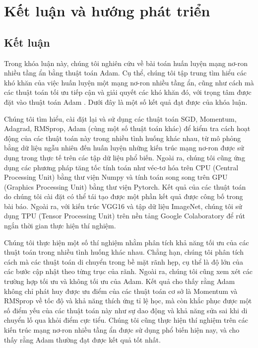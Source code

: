 \chapter{Kết luận và hướng phát triển}
\label{Chapter5}

\section{Kết luận}

Trong khóa luận này, chúng tôi nghiên cứu về bài toán huấn luyện mạng nơ-ron nhiều tầng ẩn bằng thuật toán Adam. Cụ thể, chúng tôi tập trung tìm hiểu các khó khăn của việc huấn luyện một mạng nơ-ron nhiều tầng ẩn, cũng như cách mà các thuật toán tối ưu tiếp cận và giải quyết các khó khăn đó, với trọng tâm được đặt vào thuật toán Adam \cite{kingma2014adam}. Dưới đây là một số kết quả đạt được của khóa luận.

Chúng tôi tìm hiểu, cài đặt lại và sử dụng các thuật toán SGD, Momentum, Adagrad, RMSprop, Adam (cùng một số thuật toán khác) để kiểm tra cách hoạt động của các thuật toán này trong nhiều tình huống khác nhau, từ mô phỏng bằng dữ liệu ngẫu nhiên đến huấn luyện những kiến trúc mạng nơ-ron được sử dụng trong thực tế trên các tập dữ liệu phổ biến. Ngoài ra, chúng tôi cũng ứng dụng các phương pháp tăng tốc tính toán như véc-tơ hóa trên CPU (Central Processing Unit) bằng thư viện Numpy và tính toán song song trên GPU (Graphics Processing Unit) bằng thư viện Pytorch. Kết quả của các thuật toán do chúng tôi cài đặt có thể tái tạo được một phần kết quả được công bố trong bài báo. Ngoài ra, với kiến trúc VGG16 và tập dữ liệu ImageNet, chúng tôi sử dụng TPU (Tensor Processing Unit) trên nền tảng Google Colaboratory để rút ngắn thời gian thực hiện thí nghiệm.

Chúng tôi thực hiện một số thí nghiệm nhằm phân tích khả năng tối ưu của các thuật toán trong nhiều tình huống khác nhau. Chẳng hạn, chúng tôi phân tích cách mà các thuật toán di chuyển trong bề mặt rãnh hẹp, cụ thể là độ lớn của các bước cập nhật theo từng trục của rãnh. Ngoài ra, chúng tôi cũng xem xét các trường hợp tối ưu và không tối ưu của Adam. Kết quả cho thấy rằng Adam không chỉ phát huy được ưu điểm của các thuật toán cơ sở là Momentum và RMSprop về tốc độ và khả năng thích ứng tỉ lệ học, mà còn khắc phục được một số điểm yếu của các thuật toán này như sự dao động và khả năng sửa sai khi di chuyển lố qua khỏi điểm cực tiểu. Chúng tôi cũng thực hiện thí nghiệm trên các kiến trúc mạng nơ-ron nhiều tầng ẩn được sử dụng phổ biến hiện nay, và cho thấy rằng Adam thường đạt được kết quả tốt nhất.


